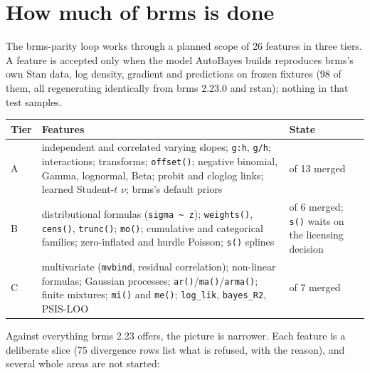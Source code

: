 \documentclass[11pt]{article}
\newcommand{\code}[1]{\texttt{#1}}
\begin{document}
\section{How much of brms is done}
\label{sec:done}

The brms-parity loop works through a planned scope of 26 features in three tiers. A feature is accepted only when the
model AutoBayes builds reproduces brms's own Stan data, log density, gradient and predictions on frozen fixtures
(98 of them, all regenerating identically from brms 2.23.0 and rstan); nothing in that test samples.

\begin{center}\small
\begin{tabular}{@{}>{\raggedright\arraybackslash}p{}>{\raggedright\arraybackslash}p{}>{\raggedright\arraybackslash}p{}@{}}
\toprule
Tier & Features & State \\
\midrule
A & independent and correlated varying slopes; \code{g:h}, \code{g/h}; interactions; transforms; \code{offset()}; negative binomial, Gamma, lognormal, Beta; probit and cloglog links; learned Student-$t$ $\nu$; brms's default priors & 13 of 13 merged \\
B & distributional formulas (\code{sigma \textasciitilde{} z}); \code{weights()}, \code{cens()}, \code{trunc()}; \code{mo()}; cumulative and categorical families; zero-inflated and hurdle Poisson; \code{s()} splines & 5 of 6 merged; \code{s()} waits on the licensing decision \\
C & multivariate (\code{mvbind}, residual correlation); non-linear formulas; Gaussian processes; \code{ar()}/\code{ma()}/\code{arma()}; finite mixtures; \code{mi()} and \code{me()}; \code{log\_lik}, \code{bayes\_R2}, PSIS-LOO & 7 of 7 merged \\
\bottomrule
\end{tabular}\end{center}

\noindent Against everything brms 2.23 offers, the picture is narrower. Each feature is a deliberate slice (75 divergence
rows list what is refused, with the reason), and several whole areas are not started:
\end{document}
